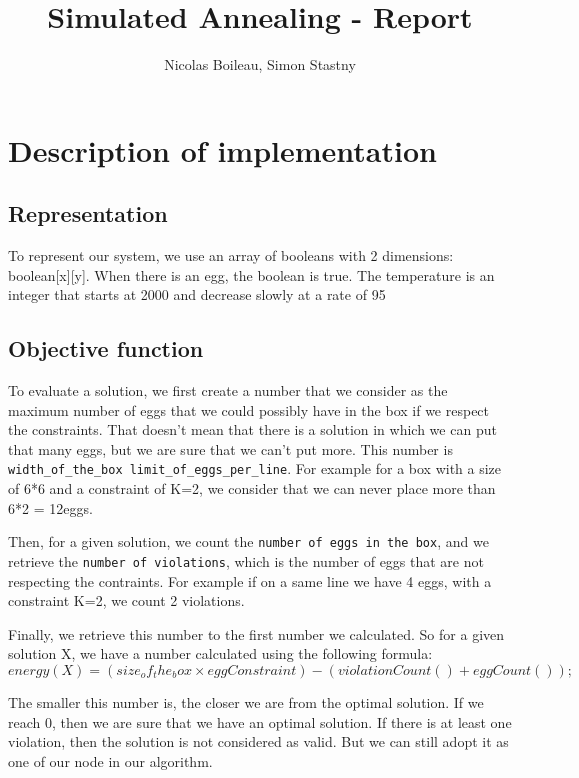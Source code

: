 \documentclass{article}
\begin{document}
\providecommand{\abs}[1]{\lvert#1\rvert}

\title{Simulated Annealing - Report}
\author{Nicolas Boileau, Simon Stastny}

\maketitle

\section{Description of implementation}

\subsection{Representation}

To represent our system, we use an array of booleans with 2
dimensions: boolean[x][y]. When there is an egg, the boolean is true. The
temperature is an integer that starts at 2000 and decrease slowly at a rate of
95%

\subsection{Objective function}

To evaluate a solution, we first create a number that we consider as the
maximum number of eggs that we could possibly have in the box if we respect the
constraints. That doesn't mean that there is a solution in which we can put
that many eggs, but we are sure that we can't put more. This number is
\texttt{width_of_the_box \times limit_of_eggs_per_line}. For example for a box
with a size of 6*6 and a constraint of K=2, we consider that we can never place more than 6*2
= 12eggs.

Then, for a given solution, we count the \texttt{number of eggs in the box}, and
we retrieve the \texttt{number of violations}, which is the number of eggs that
are not respecting the contraints. For example if on a same line we have 4 eggs, with a
constraint K=2, we count 2 violations.

Finally, we retrieve this number to the first number we calculated. So for a
given solution X, we have a number calculated using the following formula:
\[
energy(X) = (size_of_the_box \times eggConstraint) - (violationCount() +
eggCount());
\]

The smaller this number is, the closer we are from the optimal solution. If we
reach 0, then we are sure that we have an optimal solution. If there is at
least one violation, then the solution is not considered as valid. But we can
still adopt it as one of our node in our algorithm.
\end{document}
